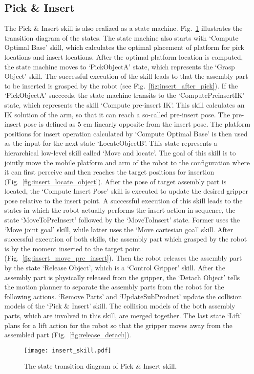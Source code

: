 \subsection{Pick \& Insert}
The Pick \& Insert skill is also realized as a state machine. Fig.~\ref{fig:insert_skill} illustrates the transition diagram of the states. The state machine also starts with `Compute Optimal Base' skill, which calculates the optimal placement of platform for  pick locations and insert locations. After the optimal platform location is computed, the state machine moves to `PickObjectA' state, which represents the `Grasp Object' skill. The successful execution of the skill leads to that the assembly part to be inserted is grasped by the robot (see Fig.~\ref{fig:insert_after_pick}). If the `PickObjectA' succeeds, the state machine transits to the `ComputePreinsertIK' state, which represents the skill `Compute pre-insert IK'. This skill calculates an IK solution of the arm, so that it can reach a so-called pre-insert pose. The pre-insert pose is defined as 5 cm linearly opposite from the insert pose. The platform positions for insert operation calculated by `Compute Optimal Base' is then used as the input for the next state `LocateObjectB'. This state represents a hierarchical low-level skill called `Move and locate'. The goal of this skill is to jointly move the mobile platform and arm of the robot to the configuration where it can first perceive and then reaches the target positions for insertion (Fig.~\ref{fig:insert_locate_object}). After the pose of target assembly part is located, the `Compute Insert Pose' skill is executed to update the desired gripper pose relative to the insert point. A successful execution of this skill leads to the states in which the robot actually performs the insert action in sequence, the state `MoveToPreInsert' followed by the `MoveToInsert' state. Former uses the `Move joint goal' skill, while latter uses the `Move cartesian goal' skill. After successful execution of both skills, the assembly part which grasped by the robot is by the moment inserted to the target point (Fig.~\ref{fig:insert_move_pre_insert}). Then the robot releases the assembly part by the state `Release Object', which is a `Control Gripper' skill. After the assembly part is physically released from the gripper, the `Detach Object' tells the motion planner to separate the assembly parts from the robot for the following actions. `Remove Parts' and `UpdateSubProduct' update the collision models of the `Pick \& Insert' skill. The collision models of the both assembly parts, which are involved in this skill, are merged together. The last state `Lift' plans for a lift action for the robot so that the gripper moves away from the assembled part (Fig.~\ref{fig:release_detach}).
\begin{figure}[!htbp]
\centering
\texttt{[image: insert\_skill.pdf]}
\captionsetup{justification=raggedright}
\caption{The state transition diagram of Pick \& Insert skill.}
\label{fig:insert_skill}
\end{figure}

